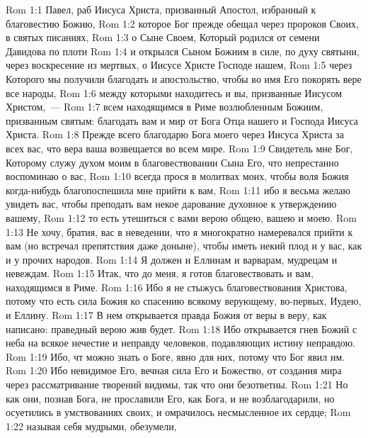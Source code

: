 \vs Rom 1:1 Павел, раб Иисуса Христа, призванный Апостол, избранный к благовестию Божию,
\vs Rom 1:2 которое Бог прежде обещал через пророков Своих, в святых писаниях,
\vs Rom 1:3 о Сыне Своем, Который родился от семени Давидова по плоти
\vs Rom 1:4 и открылся Сыном Божиим в силе, по духу святыни, через воскресение из мертвых, о Иисусе Христе Господе нашем,
\vs Rom 1:5 через Которого мы получили благодать и апостольство, чтобы во имя Его покорять вере все народы,
\vs Rom 1:6 между которыми находитесь и вы, призванные Иисусом Христом,~---
\vs Rom 1:7 всем находящимся в Риме возлюбленным Божиим, призванным святым: благодать вам и мир от Бога Отца нашего и Господа Иисуса Христа.
\rsbpar\vs Rom 1:8 Прежде всего благодарю Бога моего через Иисуса Христа за всех вас, что вера ваша возвещается во всем мире.
\vs Rom 1:9 Свидетель мне Бог, Которому служу духом моим в благовествовании Сына Его, что непрестанно воспоминаю о вас,
\vs Rom 1:10 всегда прося в молитвах моих, чтобы воля Божия когда-нибудь благопоспешила мне прийти к вам,
\vs Rom 1:11 ибо я весьма желаю увидеть вас, чтобы преподать вам некое дарование духовное к утверждению вашему,
\vs Rom 1:12 то есть утешиться с вами верою общею, вашею и моею.
\vs Rom 1:13 Не хочу, братия,  вас в неведении, что я многократно намеревался прийти к вам (но встречал препятствия даже доныне), чтобы иметь некий плод и у вас, как и у прочих народов.
\vs Rom 1:14 Я должен и Еллинам и варварам, мудрецам и невеждам.
\vs Rom 1:15 Итак, что до меня, я готов благовествовать и вам, находящимся в Риме.
\vs Rom 1:16 Ибо я не стыжусь благовествования Христова, потому что  есть сила Божия ко спасению всякому верующему, во-первых, Иудею,  и Еллину.
\vs Rom 1:17 В нем открывается правда Божия от веры в веру, как написано: праведный верою жив будет.
\rsbpar\vs Rom 1:18 Ибо открывается гнев Божий с неба на всякое нечестие и неправду человеков, подавляющих истину неправдою.
\vs Rom 1:19 Ибо, чт можно знать о Боге, явно для них, потому что Бог явил им.
\vs Rom 1:20 Ибо невидимое Его, вечная сила Его и Божество, от создания мира через рассматривание творений видимы, так что они безответны.
\vs Rom 1:21 Но как они, познав Бога, не прославили Его, как Бога, и не возблагодарили, но осуетились в умствованиях своих, и омрачилось несмысленное их сердце;
\vs Rom 1:22 называя себя мудрыми, обезумели,
